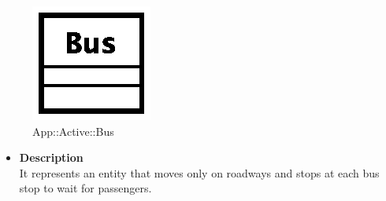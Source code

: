 \begin{figure}[h]
\centering
\includegraphics[scale=0.6,keepaspectratio]{images/solution/bus.eps}
\caption{App::Active::Bus}
\label{fig:sd-app-bus}
\end{figure}
\FloatBarrier
\begin{itemize}
  \item \textbf{Description} \\
It represents an entity that moves only on roadways and stops at each bus stop to
wait for passengers.
\end{itemize} 

